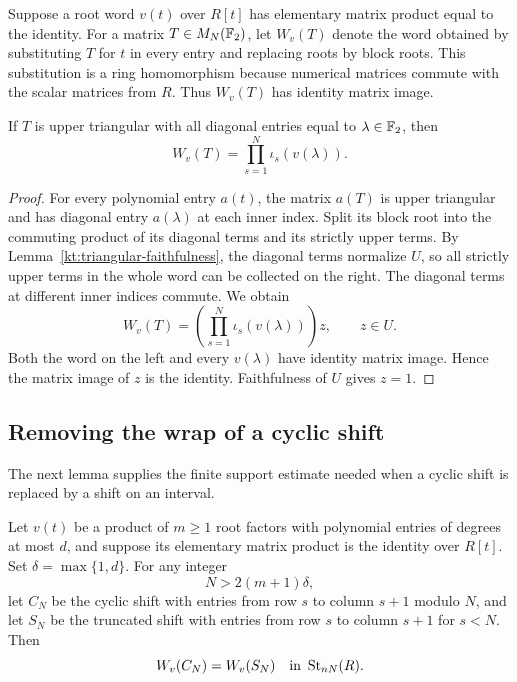 Suppose a root word $v(t)$ over $R[t]$ has elementary matrix product
equal to the identity.  For a matrix $T\in M_N(\mathbb F_2)$, let $W_v(T)$
denote the word obtained by substituting $T$ for $t$ in every entry
and replacing roots by block roots.  This substitution is a ring
homomorphism because numerical matrices commute with the scalar
matrices from $R$.  Thus $W_v(T)$ has identity matrix image.

\begin{lemma}\label{kt:triangular-evaluation}
If $T$ is upper triangular with all diagonal entries equal to
$\lambda\in\mathbb F_2$, then
\[
 W_v(T)=\prod_{s=1}^{N}\iota_s(v(\lambda)).
\]
\end{lemma}

\begin{proof}
For every polynomial entry $a(t)$, the matrix $a(T)$ is upper
triangular and has diagonal entry $a(\lambda)$ at each inner index.
Split its block root into the commuting product of its diagonal
terms and its strictly upper terms.  By
Lemma~\ref{kt:triangular-faithfulness}, the diagonal terms normalize
$U$, so all strictly upper terms in the whole word can be collected
on the right.  The diagonal terms at different inner indices commute.
We obtain
\[
 W_v(T)=\left(\prod_{s=1}^{N}\iota_s(v(\lambda))\right)z,
 \qquad z\in U.
\]
Both the word on the left and every $v(\lambda)$ have identity
matrix image.  Hence the matrix image of $z$ is the identity.
Faithfulness of $U$ gives $z=1$.
\end{proof}

\subsection{Removing the wrap of a cyclic shift}

The next lemma supplies the finite support estimate needed when a
cyclic shift is replaced by a shift on an interval.

\begin{lemma}\label{kt:wrap-removal}
Let $v(t)$ be a product of $m\geq 1$ root factors with polynomial
entries of degrees at most $d$, and suppose its elementary matrix
product is the identity over $R[t]$.  Set $\delta=\max\{1,d\}$.
For any integer
\[
 N>2(m+1)\delta,
\]
let $C_N$ be the cyclic shift with entries from row $s$ to column
$s+1$ modulo $N$, and let $S_N$ be the truncated shift with entries
from row $s$ to column $s+1$ for $s<N$.  Then
\[
 W_v(C_N)=W_v(S_N)\quad\hbox{in }\operatorname{St}_{nN}(R).
\]
\end{lemma}

